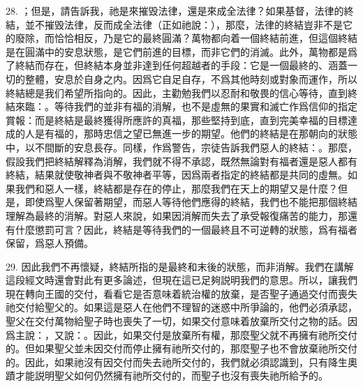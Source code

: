 28. ；但是，請告訴我，祂是來摧毁法律，還是來成全法律？如果基督，法律的終結，並不摧毁法律，反而成全法律（正如祂說：），那麼，法律的終結豈非不是它的廢除，而恰恰相反，乃是它的最終圓滿？萬物都向着一個終結前進，但這個終結是在圓滿中的安息狀態，是它們前進的目標，而非它們的消滅。此外，萬物都是爲了終結而存在，但終結本身並非達到任何超越者的手段：它是一個最終的、涵蓋一切的整體，安息於自身之内。因爲它自足自存，不爲其他時刻或對象而運作，所以終結總是我们希望所指向的。因此，主勸勉我們以忍耐和敬畏的信心等待，直到終結來臨：。等待我們的並非有福的消解，也不是虛無的果實和滅亡作爲信仰的指定賞報：而是終結是最終獲得所應許的真福，那些堅持到底，直到完美幸福的目標達成的人是有福的，那時忠信之望已無進一步的期望。他們的終結是在那朝向的狀態中，以不間斷的安息長存。同樣，作爲警告，宗徒告訴我們惡人的終結：。那麼，假設我們把終結解釋為消解，我們就不得不承認，既然無論對有福者還是惡人都有終結，結果就使敬神者與不敬神者平等，因爲兩者指定的終結都是共同的虛無。如果我們和惡人一樣，終結都是存在的停止，那麼我們在天上的期望又是什麼？但是，即使爲聖人保留著期望，而惡人等待他們應得的終結，我們也不能把那個終結理解為最終的消解。對惡人來說，如果因消解而失去了承受報復痛苦的能力，那還有什麼懲罰可言？因此，終結是等待我們的一個最終且不可逆轉的狀態，爲有福者保留，爲惡人預備。\par

29. 因此我們不再懷疑，終結所指的是最終和末後的狀態，而非消解。我們在講解這段經文時還會對此有更多論述，但現在這已足夠説明我們的意思。所以，讓我們現在轉向王國的交付，看看它是否意味着統治權的放棄，是否聖子通過交付而喪失祂交付給聖父的。如果這是惡人在他們不理智的迷惑中所爭論的，他們必須承認，聖父在交付萬物給聖子時也喪失了一切，如果交付意味着放棄所交付之物的話。因爲主說：，又說：。因此，如果交付是放棄所有權，那麼聖父就不再擁有祂所交付的。但如果聖父並未因交付而停止擁有祂所交付的，那麼聖子也不會放棄祂所交付的。因此，如果祂沒有因交付而失去祂所交付的，我們就必須認識到，只有降生奧蹟才能説明聖父如何仍然擁有祂所交付的，而聖子也沒有喪失祂所給予的。\par


